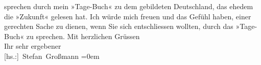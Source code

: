 \begin{ledgroupsized}[t]{13cm}
               sprechen durch mein »Tage-Buch« zu dem gebildeten
                  Deutschland, das ehedem die »Zukunft« gelesen hat. Ich würde mich freuen und das Gefühl haben,
               einer gerechten Sache zu dienen, wenn Sie sich entschliessen wollten, durch das »Tage-Buch« zu sprechen.\pend
           \pstart
           Mit herzlichen Grüssen{\\[\baselineskip]} Ihr sehr ergebener{\\[\baselineskip]}\spacefill\mbox{{[}hs.:{]} Stefan Großmann}\pend
           \leftskip=0em{}\endnumbering{}\end{ledgroupsized}  \newcommand{\dateiname}{L02362}\newcommand{\titel}{Stefan Großmann an Arthur Schnitzler, 10. 2. 1921}\newcommand{\editorInnen}{ Martin Anton Müller und Gerd-Hermann Susen}
      